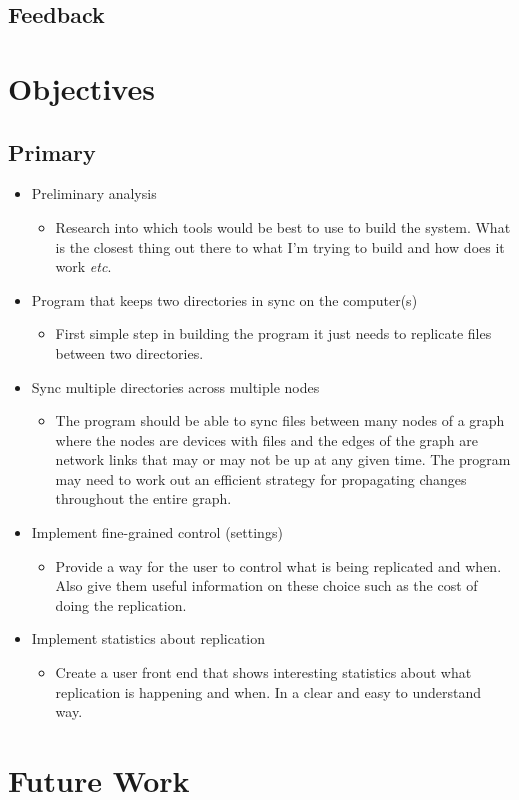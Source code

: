 \documentclass[12pt]{article}
\begin{document}
\subsection{Feedback}

\section{Objectives}
\subsection*{Primary}
\begin{itemize}
    \item Preliminary analysis
        \begin{itemize}
        \item Research into which tools would be best to use to build the system. What is the closest thing out there to what I'm trying to build and how does it work \emph{etc}.
        \end{itemize}

    \item Program that keeps two directories in sync on the computer(s)
        \begin{itemize}
        \item First simple step in building the program it just needs to replicate files between two directories.
        \end{itemize}


    \item Sync multiple directories across multiple nodes
        \begin{itemize}
        \item The program should be able to sync files between many nodes of a graph where the nodes are devices with files and the edges of the graph are network links that may or may not be up at any given time. The program may need to work out an efficient strategy for propagating changes throughout the entire graph.
        \end{itemize}


    \item Implement fine-grained control (settings)
        \begin{itemize}
        \item Provide a way for the user to control what is being replicated and when. Also give them useful information on these choice such as the cost of doing the replication.
        \end{itemize}


    \item Implement statistics about replication
        \begin{itemize}
        \item Create a user front end that shows interesting statistics about what replication is happening and when. In a clear and easy to understand way.
        \end{itemize}

\end{itemize}

\section{Future Work}
\end{document}
